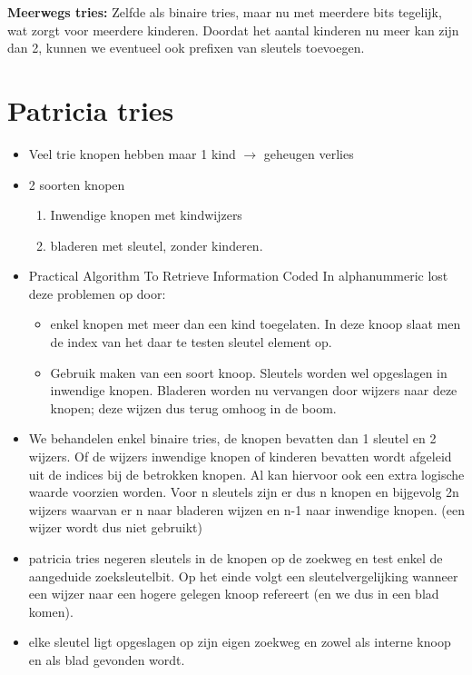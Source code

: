 \begin{mdframed}[leftmargin=10pt,rightmargin=10pt]
\textbf{Meerwegs tries:} Zelfde als binaire tries, maar nu met meerdere bits tegelijk, wat zorgt voor meerdere kinderen. Doordat het aantal kinderen nu meer kan zijn dan 2, kunnen we eventueel ook prefixen van sleutels toevoegen.
\end{mdframed}
\clearpage
\section{Patricia tries}
\begin{itemize}
\item Veel trie knopen hebben maar 1 kind $\rightarrow$ geheugen verlies
\item 2 soorten knopen 
\begin{enumerate}
\item Inwendige knopen met kindwijzers
\item bladeren met sleutel, zonder kinderen.
\end{enumerate}
\item Practical Algorithm To Retrieve Information Coded In alphanummeric lost deze problemen op door:
\begin{itemize}
\item enkel knopen met meer dan een kind toegelaten. In deze knoop slaat men de index van het daar te testen sleutel element op.
\item Gebruik maken van een soort knoop. Sleutels worden wel opgeslagen in inwendige knopen. Bladeren worden nu vervangen door wijzers naar deze knopen; deze wijzen dus terug omhoog in de boom.
\end{itemize}
\clearpage
\item We behandelen enkel binaire tries, de knopen bevatten dan 1 sleutel en 2 wijzers. Of de wijzers inwendige knopen of kinderen bevatten wordt afgeleid uit de indices bij de betrokken knopen. Al kan hiervoor ook een extra logische waarde voorzien worden. Voor n sleutels zijn er dus n knopen en bijgevolg 2n wijzers waarvan er n naar bladeren wijzen en n-1 naar inwendige knopen. (een wijzer wordt dus niet gebruikt)
\item patricia tries negeren sleutels in de knopen op de zoekweg en test enkel de aangeduide zoeksleutelbit. Op het einde volgt een sleutelvergelijking wanneer een wijzer naar een hogere gelegen knoop refereert (en we dus in een blad komen).
\item elke sleutel ligt opgeslagen op zijn eigen zoekweg en zowel als interne knoop en als blad gevonden wordt.

\end{itemize}
